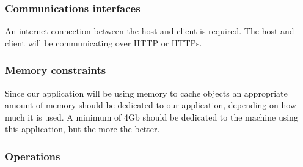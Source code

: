 

\subsubsection{Communications interfaces}

An internet connection between the host and client is required.
The host and client will be communicating over HTTP or HTTPs.


\subsubsection{Memory constraints}

Since our application will be using memory to cache objects an appropriate amount of memory should be dedicated to our application, depending on how much it is used.
A minimum of 4Gb should be dedicated to the machine using this application, but the more the better.

\subsubsection{Operations}

